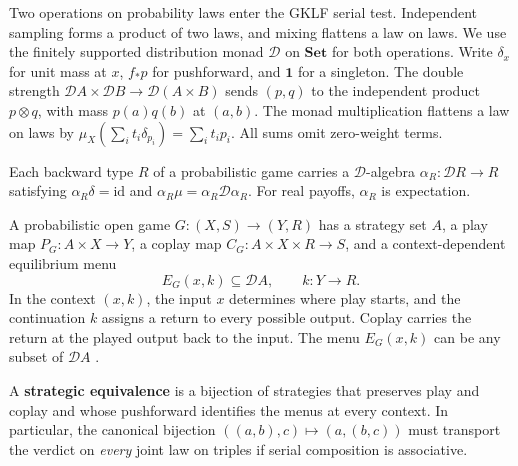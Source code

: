 \documentclass[11pt,a4paper]{article}
\theoremstyle{definition}
\newcommand{\D}{\mathcal D}
\newcommand{\one}{\mathbf 1}
\newcommand{\Set}{\mathbf{Set}}
\begin{document}
Two operations on probability laws enter the GKLF serial test. Independent sampling forms a product of two laws, and mixing flattens a law on laws. We use the finitely supported distribution monad $\D$ on $\Set$ for both operations. Write $\delta_x$ for unit mass at $x$, $f_*p$ for pushforward, and $\one$ for a singleton. The double strength $\D A\times\D B\to\D(A\times B)$ sends $(p,q)$ to the independent product $p\otimes q$, with mass $p(a)q(b)$ at $(a,b)$. The monad multiplication flattens a law on laws by $\mu_X(\sum_i t_i\delta_{p_i})=\sum_i t_i p_i$. All sums omit zero-weight terms.

Each backward type $R$ of a probabilistic game carries a $\D$-algebra $\alpha_R:\D R\to R$ satisfying $\alpha_R\delta=\mathrm{id}$ and $\alpha_R\mu=\alpha_R\D\alpha_R$. For real payoffs, $\alpha_R$ is expectation.

A probabilistic open game $G:(X,S)\to(Y,R)$ has a strategy set $A$, a play map $P_G:A\times X\to Y$, a coplay map $C_G:A\times X\times R\to S$, and a context-dependent equilibrium menu
\[
    E_G(x,k)\subseteq\D A,\qquad k:Y\to R.
\]
In the context $(x,k)$, the input $x$ determines where play starts, and the continuation $k$ assigns a return to every possible output. Coplay carries the return at the played output back to the input. The menu $E_G(x,k)$ can be any subset of $\D A$ \cite[Definition~3]{gklf}.

A \textbf{strategic equivalence} is a bijection of strategies that preserves play and coplay and whose pushforward identifies the menus at every context. In particular, the canonical bijection $((a,b),c)\mapsto(a,(b,c))$ must transport the verdict on \emph{every} joint law on triples if serial composition is associative.
\end{document}
